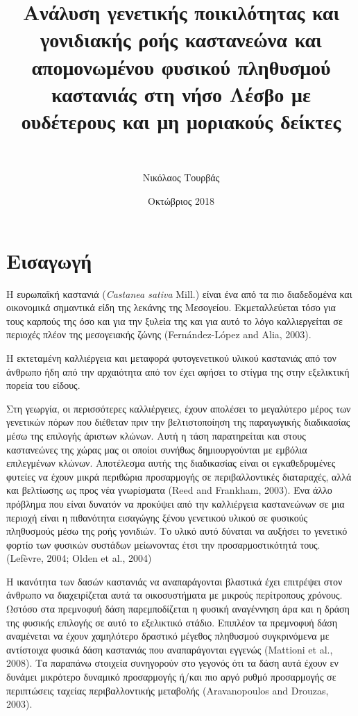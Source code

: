 \documentclass[12pt,a4paper,]{report}
\title{Ανάλυση γενετικής ποικιλότητας και γονιδιακής ροής καστανεώνα και
απομονωμένου φυσικού πληθυσμού καστανιάς στη νήσο Λέσβο με ουδέτερους
και μη μοριακούς δείκτες}
\subtitle{~}
\author{Νικόλαος Τουρβάς}
\date{Οκτώβριος 2018}
\begin{document}
\maketitle

\section{Εισαγωγή}

Η ευρωπαϊκή καστανιά (\emph{Castanea sativa} Mill.) είναι ένα από τα πιο
διαδεδομένα και οικονομικά σημαντικά είδη της λεκάνης της Μεσογείου.
Εκμεταλλεύεται τόσο για τους καρπούς της όσο και για την ξυλεία της και
για αυτό το λόγο καλλιεργείται σε περιοχές πλέον της μεσογειακής ζώνης
(Fernández-López and Alia, 2003).

Η εκτεταμένη καλλιέργεια και μεταφορά φυτογενετικού υλικού καστανιάς από
τον άνθρωπο ήδη από την αρχαιότητα από τον έχει αφήσει το στίγμα της
στην εξελικτική πορεία του είδους.

Στη γεωργία, οι περισσότερες καλλιέργειες, έχουν απολέσει το μεγαλύτερο
μέρος των γενετικών πόρων που διέθεταν πριν την βελτιστοποίηση της
παραγωγικής διαδικασίας μέσω της επιλογής άριστων κλώνων. Αυτή η τάση
παρατηρείται και στους καστανεώνες της χώρας μας οι οποίοι συνήθως
δημιουργούνται με εμβόλια επιλεγμένων κλώνων. Αποτέλεσμα αυτής της
διαδικασίας είναι οι εγκαθεδρυμένες φυτείες να έχουν μικρά περιθώρια
προσαρμογής σε περιβαλλοντικές διαταραχές, αλλά και βελτίωσης ως προς
νέα γνωρίσματα (Reed and Frankham, 2003). Ένα άλλο πρόβλημα που είναι
δυνατόν να προκύψει από την καλλιέργεια καστανεώνων σε μια περιοχή είναι
η πιθανότητα εισαγώγης ξένου γενετικού υλικού σε φυσικούς πληθυσμούς
μέσω της ροής γονιδιών. Το υλικό αυτό δύναται να αυξήσει το γενετικό
φορτίο των φυσικών συστάδων μείωνοντας έτσι την προσαρμοστικότητά τους.
(Lefèvre, 2004; Olden et al., 2004)

Η ικανότητα των δασών καστανιάς να αναπαράγονται βλαστικά έχει επιτρέψει
στον άνθρωπο να διαχειρίζεται αυτά τα οικοσυστήματα με μικρούς
περίτροπους χρόνους. Ωστόσο στα πρεμνοφυή δάση παρεμποδίζεται η φυσική
αναγέννηση άρα και η δράση της φυσικής επιλογής σε αυτό το εξελικτικό
στάδιο. Επιπλέον τα πρεμνοφυή δάση αναμένεται να έχουν χαμηλότερο
δραστικό μέγεθος πληθυσμού συγκρινόμενα με αντίστοιχα φυσικά δάση
καστανιάς που αναπαράγονται εγγενώς (Mattioni et al., 2008). Τα παραπάνω
στοιχεία συνηγορούν στο γεγονός ότι τα δάση αυτά έχουν εν δυνάμει
μικρότερο δυναμικό προσαρμογής ή/και πιο αργό ρυθμό προσαρμογής σε
περιπτώσεις ταχείας περιβαλλοντικής μεταβολής (Aravanopoulos and
Drouzas, 2003).
\end{document}
